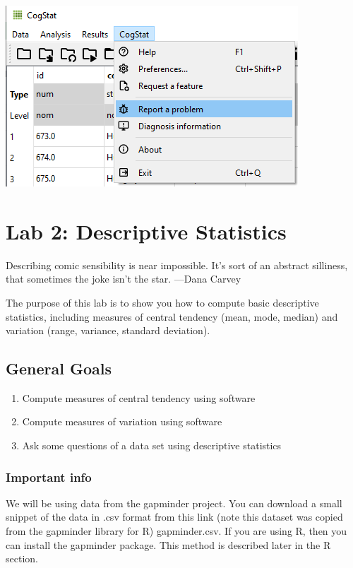 \documentclass[
]{book}
\providecommand{\tightlist}{%
  \setlength{\itemsep}{0pt}\setlength{\parskip}{0pt}}
\begin{document}
\includegraphics{img/ch1/menu_reportaproblem.png}

\hypertarget{lab-2-descriptive-statistics}{%
\chapter{Lab 2: Descriptive Statistics}\label{lab-2-descriptive-statistics}}

{
Describing comic sensibility is near impossible. It's sort of an abstract silliness, that sometimes the joke isn't the star.
---Dana Carvey
}

The purpose of this lab is to show you how to compute basic descriptive statistics, including measures of central tendency (mean, mode, median) and variation (range, variance, standard deviation).

\hypertarget{general-goals-1}{%
\section{General Goals}\label{general-goals-1}}

\begin{enumerate}
\def\labelenumi{\arabic{enumi}.}
\tightlist
\item
  Compute measures of central tendency using software
\item
  Compute measures of variation using software
\item
  Ask some questions of a data set using descriptive statistics
\end{enumerate}

\hypertarget{important-info-1}{%
\subsection{Important info}\label{important-info-1}}

We will be using data from the gapminder project. You can download a small snippet of the data in .csv format from this link (note this dataset was copied from the gapminder library for R) gapminder.csv. If you are using R, then you can install the gapminder package. This method is described later in the R section.
\end{document}
